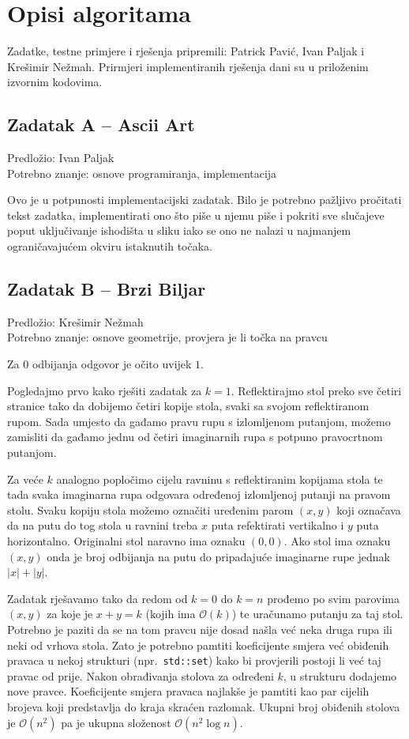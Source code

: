\documentclass[a4paper]{article}
\begin{document}
\section*{Opisi algoritama}
Zadatke, testne primjere i rješenja pripremili: Patrick Pavić, Ivan Paljak i
Krešimir Nežmah. Prirmjeri implementiranih rješenja dani su u priloženim
izvornim kodovima.

\subsection*{Zadatak A -- Ascii Art}
\textsf{Predložio: Ivan Paljak}\\
\textsf{Potrebno znanje: osnove programiranja, implementacija}

Ovo je u potpunosti implementacijski zadatak. Bilo je potrebno pažljivo
pročitati tekst zadatka, implementirati ono što piše u njemu piše i pokriti
sve slučajeve poput uključivanje ishodišta u sliku iako se ono ne nalazi u
najmanjem ograničavajućem okviru istaknutih točaka.

\subsection*{Zadatak B -- Brzi Biljar}
\textsf{Predložio: Krešimir Nežmah}\\
\textsf{Potrebno znanje: osnove geometrije, provjera je li točka na
pravcu}

Za $0$ odbijanja odgovor je očito uvijek $1$.

Pogledajmo prvo kako rješiti zadatak za $k = 1$. Reflektirajmo stol preko sve
četiri stranice tako da dobijemo četiri kopije stola, svaki sa svojom
reflektiranom rupom. Sada umjesto da gađamo pravu rupu s izlomljenom putanjom,
možemo zamisliti da gađamo jednu od četiri imaginarnih rupa s potpuno
pravocrtnom putanjom.

Za veće $k$ analogno popločimo cijelu ravninu s reflektiranim kopijama stola te
tada svaka imaginarna rupa odgovara određenoj izlomljenoj putanji na pravom
stolu. Svaku kopiju stola možemo označiti uređenim parom $(x,y)$ koji označava
da na putu do tog stola u ravnini treba $x$ puta refektirati vertikalno i $y$
puta horizontalno. Originalni stol naravno ima oznaku $(0,0)$. Ako stol ima
oznaku $(x,y)$ onda je broj odbijanja na putu do pripadajuće imaginarne rupe
jednak $|x|+|y|$.

Zadatak rješavamo tako da redom od $k=0$ do $k=n$ prođemo po svim parovima
$(x,y)$ za koje je $x+y=k$ (kojih ima $\mathcal{O}(k)$) te uračunamo putanju za
taj stol. Potrebno je paziti da se na tom pravcu nije dosad našla već neka
druga rupa ili neki od vrhova stola. Zato je potrebno pamtiti koeficijente
smjera već obiđenih pravaca u nekoj strukturi (npr.\ \texttt{std::set}) kako bi
provjerili postoji li već taj pravac od prije. Nakon obrađivanja stolova za
određeni $k$, u strukturu dodajemo nove pravce. Koeficijente smjera pravaca
najlakše je pamtiti kao par cijelih brojeva koji predstavlja do kraja skraćen
razlomak. Ukupni broj obiđenih stolova je $\mathcal{O}(n^2)$ pa je ukupna
složenost $\mathcal{O}(n^2 \log n)$.
\end{document}

